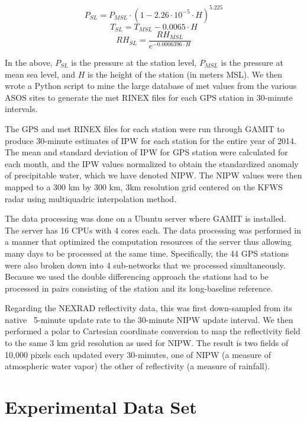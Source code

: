 \documentclass[proposal]{umassthesis}
\begin{document}
{\begin{equation}
P_{SL} = P_{MSL} \cdot (1 - 2.26 \cdot 10^{-5} \cdot H)^{5.225}
\end{equation}
\begin{equation}
T_{SL} = T_{MSL} - 0.0065 \cdot H
\end{equation}
\begin{equation}
RH_{SL} = \dfrac{RH_{MSL}}{e^{-0.0006396 \cdot H}}
\end{equation}

In the above, $P_{SL}$ is the pressure at the station level, $P_{MSL}$ is the pressure at mean sea level, and $H$ is the height of the station (in meters MSL). We then wrote a Python script to mine the large database of met values from the various ASOS sites to generate the met RINEX files for each GPS station in 30-minute intervals. 

The GPS and met RINEX files for each station were run through GAMIT to produce 30-minute estimates of IPW for each station for the entire year of 2014. The mean and standard deviation of IPW for GPS station were calculated for each month, and the IPW values normalized to obtain the standardized anomaly of precipitable water, which we have denoted NIPW. The NIPW values were then mapped to a 300 km by 300 km, 3km resolution grid centered on the KFWS radar using multiquadric interpolation method.

The data processing was done on a Ubuntu server where GAMIT is installed. The server has 16 CPUs with 4 cores each. The data processing was performed in a manner that optimized the computation resources of the server thus allowing many days to be processed at the same time. Specifically, the 44 GPS stations were also broken down into 4 sub-networks that we processed simultaneously. Because we used the double differencing approach the stations had to be processed in pairs consisting of the station and its long-baseline reference.

Regarding the NEXRAD reflectivity data, this was first down-sampled from its native ~5-minute update rate to the 30-minute NIPW update interval. We then performed a polar to Cartesian coordinate conversion to map the reflectivity field to the same 3 km grid resolution as used for NIPW. The result is two fields of 10,000 pixels each updated every 30-minutes, one of NIPW (a measure of atmospheric water vapor) the other of reflectivity (a measure of rainfall).

\section{Experimental Data Set}

}
\end{document}
